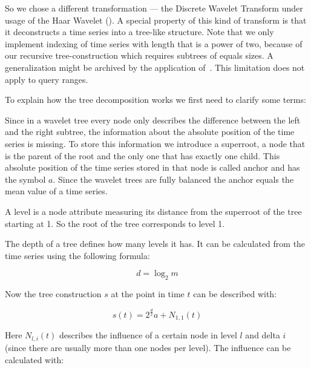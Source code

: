 So we chose a different transformation --- the Discrete Wavelet Transform under usage of the Haar Wavelet (\cite{Haar}). A special property of this kind of transform is that it deconstructs a time series into a tree-like structure. Note that we only implement indexing of time series with length that is a power of two, because of our recursive tree-construction which requires subtrees of equals sizes. A generalization might be archived by the application of~\cite{haar_tree_notwo}. This limitation does not apply to query ranges.

To explain how the tree decomposition works we first need to clarify some terms:

\begin{definition}[Superroot]
    Since in a wavelet tree every node only describes the difference between the left and the right subtree, the information about the absolute position of the time series is missing. To store this information we introduce a superroot, a node that is the parent of the root and the only one that has exactly one child. This absolute position of the time series stored in that node is called anchor and has the symbol $a$. Since the wavelet trees are fully balanced the anchor equals the mean value of a time series.
\end{definition}

\begin{definition}
    A level is a node attribute measuring its distance from the superroot of the tree starting at \num{1}. So the root of the tree corresponds to level \num{1}.

    The depth of a tree defines how many levels it has. It can be calculated from the time series using the following formula:

    \begin{equation}\label{eq:d}
        d = \log_2 m
    \end{equation}
\end{definition}

Now the tree construction $s$ at the point in time $t$ can be described with:

\begin{equation}\label{eq:tree}
    s(t) = 2^\frac{d}{2} a + N_{1,1}(t)
\end{equation}

Here $N_{l, i}(t)$ describes the influence of a certain node in level $l$ and delta $i$ (since there are usually more than one nodes per level). The influence can be calculated with:


